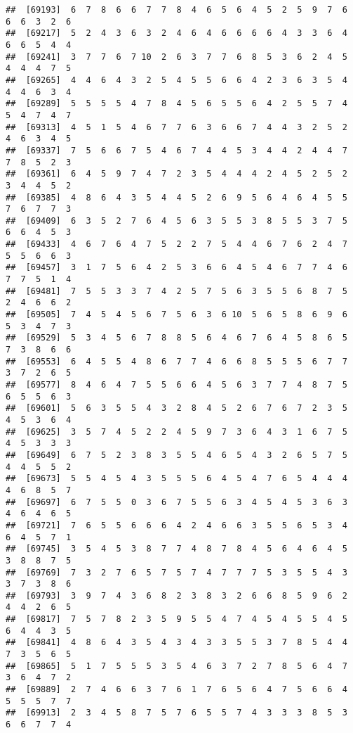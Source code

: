 \documentclass[
]{book}
\begin{document}
\begin{verbatim}
##  [69193]  6  7  8  6  6  7  7  8  4  6  5  6  4  5  2  5  9  7  6  6  6  3  2  6
##  [69217]  5  2  4  3  6  3  2  4  6  4  6  6  6  6  4  3  3  6  4  6  6  5  4  4
##  [69241]  3  7  7  6  7 10  2  6  3  7  7  6  8  5  3  6  2  4  5  4  4  4  7  5
##  [69265]  4  4  6  4  3  2  5  4  5  5  6  6  4  2  3  6  3  5  4  4  4  6  3  4
##  [69289]  5  5  5  5  4  7  8  4  5  6  5  5  6  4  2  5  5  7  4  5  4  7  4  7
##  [69313]  4  5  1  5  4  6  7  7  6  3  6  6  7  4  4  3  2  5  2  4  6  3  4  5
##  [69337]  7  5  6  6  7  5  4  6  7  4  4  5  3  4  4  2  4  4  7  7  8  5  2  3
##  [69361]  6  4  5  9  7  4  7  2  3  5  4  4  4  2  4  5  2  5  2  3  4  4  5  2
##  [69385]  4  8  6  4  3  5  4  4  5  2  6  9  5  6  4  6  4  5  5  7  6  7  7  3
##  [69409]  6  3  5  2  7  6  4  5  6  3  5  5  3  8  5  5  3  7  5  6  6  4  5  3
##  [69433]  4  6  7  6  4  7  5  2  2  7  5  4  4  6  7  6  2  4  7  5  5  6  6  3
##  [69457]  3  1  7  5  6  4  2  5  3  6  6  4  5  4  6  7  7  4  6  7  7  5  1  4
##  [69481]  7  5  5  3  3  7  4  2  5  7  5  6  3  5  5  6  8  7  5  2  4  6  6  2
##  [69505]  7  4  5  4  5  6  7  5  6  3  6 10  5  6  5  8  6  9  6  5  3  4  7  3
##  [69529]  5  3  4  5  6  7  8  8  5  6  4  6  7  6  4  5  8  6  5  7  3  8  6  6
##  [69553]  6  4  5  5  4  8  6  7  7  4  6  6  8  5  5  5  6  7  7  3  7  2  6  5
##  [69577]  8  4  6  4  7  5  5  6  6  4  5  6  3  7  7  4  8  7  5  6  5  5  6  3
##  [69601]  5  6  3  5  5  4  3  2  8  4  5  2  6  7  6  7  2  3  5  4  5  3  6  4
##  [69625]  3  5  7  4  5  2  2  4  5  9  7  3  6  4  3  1  6  7  5  4  5  3  3  3
##  [69649]  6  7  5  2  3  8  3  5  5  4  6  5  4  3  2  6  5  7  5  4  4  5  5  2
##  [69673]  5  5  4  5  4  3  5  5  5  6  4  5  4  7  6  5  4  4  4  4  6  8  5  7
##  [69697]  6  7  5  5  0  3  6  7  5  5  6  3  4  5  4  5  3  6  3  4  6  4  6  5
##  [69721]  7  6  5  5  6  6  6  4  2  4  6  6  3  5  5  6  5  3  4  6  4  5  7  1
##  [69745]  3  5  4  5  3  8  7  7  4  8  7  8  4  5  6  4  6  4  5  3  8  8  7  5
##  [69769]  7  3  2  7  6  5  7  5  7  4  7  7  7  5  3  5  5  4  3  3  7  3  8  6
##  [69793]  3  9  7  4  3  6  8  2  3  8  3  2  6  6  8  5  9  6  2  4  4  2  6  5
##  [69817]  7  5  7  8  2  3  5  9  5  5  4  7  4  5  4  5  5  4  5  6  4  4  3  5
##  [69841]  4  8  6  4  3  5  4  3  4  3  3  5  5  3  7  8  5  4  4  7  3  5  6  5
##  [69865]  5  1  7  5  5  5  3  5  4  6  3  7  2  7  8  5  6  4  7  3  6  4  7  2
##  [69889]  2  7  4  6  6  3  7  6  1  7  6  5  6  4  7  5  6  6  4  5  5  5  7  7
##  [69913]  2  3  4  5  8  7  5  7  6  5  5  7  4  3  3  3  8  5  3  6  6  7  7  4

\end{verbatim}
\end{document}
